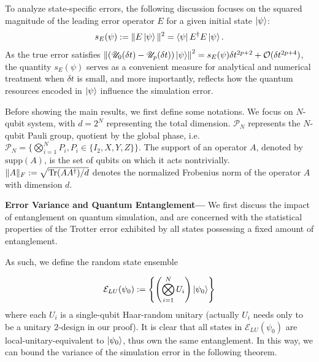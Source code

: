 \documentclass[showpacs,amsmath,amssymb,twocolumn,aps,pra,superscriptaddress,notitlepage,10pt]{revtex4-2}
\newcommand{\cP}{\mathcal P}
\newcommand{\cE}{\mathcal E_{LU}}
\newcommand{\sU}{\mathscr U}
\newcommand{\supp}{\mathrm{supp}}
\begin{document}
To analyze state-specific errors, the following discussion focuses on the squared magnitude of the leading error operator \( E \) for a given initial state \( \ket{\psi} \):
\begin{equation}
    s_E(\psi):=\|E\ket{\psi}\|^2=\bra{\psi}E^\dagger E\ket{\psi}.
    \label{equ:definition}
\end{equation}
As the true error satisfies $\norm{(\sU_0(\delta t)-\sU_p(\delta t))\ket{\psi}}^2=s_E(\psi)\delta t^{2p+2}+\mathcal O(\delta t^{2p+4})$, the quantity $s_E(\psi)$ serves as a convenient measure for analytical and numerical treatment when $\delta t$ is small, and more importantly, reflects how the quantum resources encoded in \( \ket{\psi} \) influence the simulation error.

Before showing the main results, we first define some notations. We focus on $N$-qubit system, with $d=2^N$ representing the total dimension. $\cP_N$ represents the
$N$-qubit Pauli group, quotient by the global phase, i.e.  $\cP_N=\{\bigotimes_{i=1}^N P_i, P_i\in\{I_2,X,Y,Z\}\}$. The support of an operator $A$, denoted by $\supp(A)$, is the set of qubits on which it acts nontrivially.
$\|A\|_F :=\sqrt{\Tr(AA^\dagger)/d}$ denotes the normalized Frobenius norm of the operator $A$ with dimension $d$.

\vspace{0.2cm}
\noindent\textbf{Error Variance and Quantum Entanglement---}
We first discuss the impact of entanglement on quantum simulation, and are concerned with the statistical properties of the Trotter error exhibited by all states possessing a fixed amount of entanglement.

As such, we define the random state ensemble

\begin{equation}
    \cE(\psi_0):=\left\{\left(\mathop{\bigotimes}_{i=1}^NU_i\right) \ket{\psi_0}\right\}\label{equ: E_LU}
\end{equation}
where each $U_i$ is a single-qubit Haar-random unitary \cite{Haarmeasure,Mele_2024,harrow2013church} (actually $U_i$ needs only to be a unitary $2$-design in our proof). It is clear that all states in $\cE(\psi_0)$ are local-unitary-equivalent to $\ket{\psi_0}$, thus own the same entanglement. In this way, we can bound the variance of the simulation error in the following theorem.
\end{document}
